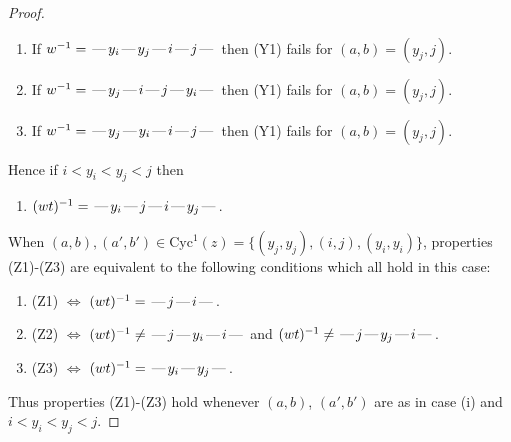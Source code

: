 \documentclass[10pt]{article}
\theoremstyle{definition}
\theoremstyle{definition}
\def\dash{\text{\hspace{0.5mm}---\hspace{0.5mm}}}
\def\Cyc{\mathrm{Cyc}}
\begin{document}
\begin{proof}
\begin{enumerate}
\item If $w^{-1} = \dash y_i\dash y_j\dash i\dash j\dash $ then (Y1) fails for $(a,b)=(y_j,j)$.
\item If $w^{-1} = \dash y_j\dash i\dash j\dash y_i\dash $ then (Y1) fails for $(a,b)=(y_j,j)$.
\item If $w^{-1} = \dash y_j\dash y_i\dash i\dash j\dash $ then (Y1) fails for $(a,b)=(y_j,j)$.
\end{enumerate}
Hence if $i < y_i < y_j < j$ then \begin{enumerate}\item[] $(wt)^{-1} = \dash y_i\dash j\dash i\dash y_j\dash $. \end{enumerate}
When $(a,b),(a',b')\in\Cyc^1(z)= \{(y_j,y_j),(i,j),(y_i,y_i)\}$,
properties (Z1)-(Z3) are equivalent to the following conditions which all hold in this case:
\begin{enumerate}
\item[](Z1) $\Leftrightarrow$ $(wt)^{-1} = \dash j \dash i \dash$.
\item[](Z2) $\Leftrightarrow$ $(wt)^{-1} \neq \dash j \dash y_i \dash i \dash$  and $(wt)^{-1} \neq \dash j \dash y_j \dash i \dash$.
\item[](Z3) $\Leftrightarrow$ $(wt)^{-1} = \dash y_i \dash y_j \dash$.
\end{enumerate}
Thus properties (Z1)-(Z3) hold whenever $(a,b)$, $(a',b')$ are as in case (i) and $i < y_i < y_j < j$.

\end{proof}
\end{document}
